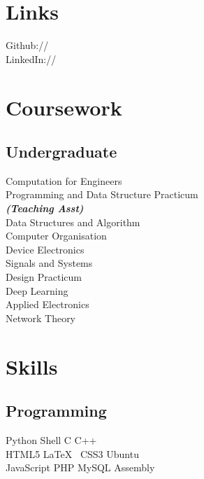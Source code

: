 \documentclass[]{deedy-resume-openfont}
\begin{document}
\begin{minipage}[t]{0.33\textwidth}
\section{Links} 
Github:// \href{https://github.com/shreyasbapat}{} \\
LinkedIn://  \href{https://www.linkedin.com/in/shreyasbapat}{} \\
\sectionsep


\section{Coursework}

\subsection{Undergraduate}
Computation for Engineers \\
Programming and Data Structure Practicum \\
{\footnotesize \textit{\textbf{(Teaching Asst) }}} \\
Data Structures and Algorithm \\
Computer Organisation \\
Device Electronics \\
Signals and Systems \\
Design Practicum \\
Deep Learning \\
Applied Electronics \\
Network Theory \\
\sectionsep


\section{Skills}
\subsection{Programming}
Python \textbullet{}   Shell \textbullet{} C \textbullet{} C++ \\
HTML5 \textbullet{} \LaTeX\ \textbullet{} CSS3 \textbullet{} Ubuntu\\ 
JavaScript \textbullet{} PHP \textbullet{} MySQL \textbullet{} Assembly \\
\sectionsep


\end{minipage}
\end{document}
